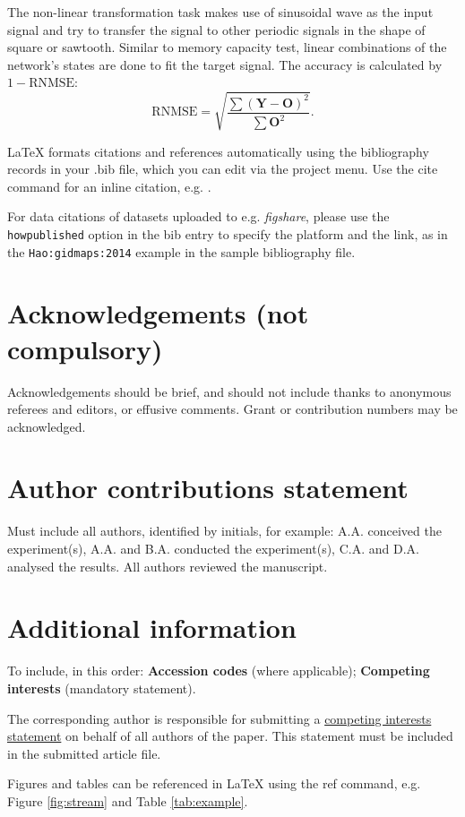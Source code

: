 \documentclass[fleqn,10pt,  amsmath,amssymb,aps]{wlscirep}
\begin{document}
The non-linear transformation task makes use of sinusoidal wave as the input signal and try to transfer the signal to other periodic signals in the shape of square or sawtooth. Similar to memory capacity test, linear combinations of the network's states are done to fit the target signal. The accuracy is calculated by $1 - \text{RNMSE}$:
\begin{equation}
	\text{RNMSE} = \sqrt{\dfrac{\sum (\mathbf Y - \mathbf O)^2}{\sum \mathbf O^2}}.
\end{equation}

\label{paper1}

\noindent LaTeX formats citations and references automatically using the bibliography records in your .bib file, which you can edit via the project menu. Use the cite command for an inline citation, e.g.  \cite{Hao:gidmaps:2014}.

For data citations of datasets uploaded to e.g. \emph{figshare}, please use the \verb|howpublished| option in the bib entry to specify the platform and the link, as in the \verb|Hao:gidmaps:2014| example in the sample bibliography file.

\section*{Acknowledgements (not compulsory)}

Acknowledgements should be brief, and should not include thanks to anonymous referees and editors, or effusive comments. Grant or contribution numbers may be acknowledged.

\section*{Author contributions statement}

Must include all authors, identified by initials, for example:
A.A. conceived the experiment(s),  A.A. and B.A. conducted the experiment(s), C.A. and D.A. analysed the results.  All authors reviewed the manuscript. 

\section*{Additional information}

To include, in this order: \textbf{Accession codes} (where applicable); \textbf{Competing interests} (mandatory statement). 

The corresponding author is responsible for submitting a \href{http://www.nature.com/srep/policies/index.html#competing}{competing interests statement} on behalf of all authors of the paper. This statement must be included in the submitted article file.

Figures and tables can be referenced in LaTeX using the ref command, e.g. Figure \ref{fig:stream} and Table \ref{tab:example}.
\end{document}
